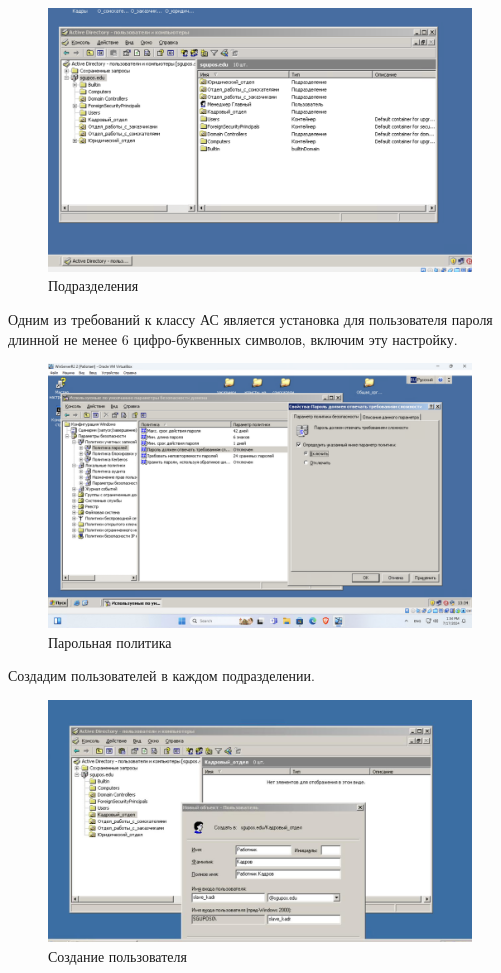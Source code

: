 \begin{figure}[H]
  \centering
  \includegraphics[width=1\textwidth]{pict/prac/3}
  \caption{Подразделения}
  \label{fig:11}
\end{figure}

Одним из требований к классу АС является установка для пользователя пароля длинной не менее 6 
цифро-буквенных символов, включим эту настройку.
\begin{figure}[H]
  \centering
  \includegraphics[width=1\textwidth]{pict/7}
  \caption{Парольная политика}
  \label{fig:19}
\end{figure}

Создадим пользователей в каждом подразделении.
\begin{figure}[H]
  \centering
  \includegraphics[width=1\textwidth]{pict/prac/1}
  \caption{Создание пользователя}
  \label{fig:12}
\end{figure}

